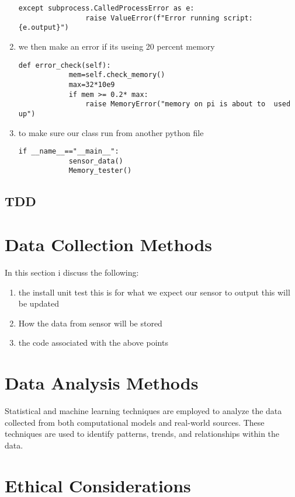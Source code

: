 \begin{enumerate}
\begin{lstlisting}[style=mystyle]
            except subprocess.CalledProcessError as e:
                raise ValueError(f"Error running script:{e.output}")
    \end{lstlisting}
    \item  we then  make an error if its useing  20 percent memory
    \begin{lstlisting}[style=mystyle]
        def error_check(self):
            mem=self.check_memory()
            max=32*10e9
            if mem >= 0.2* max:
                raise MemoryError("memory on pi is about to  used up")
    \end{lstlisting}
    \item to make sure  our class run from another python file 
    \begin{lstlisting}[style=mystyle]
        if __name__=="__main__":
            sensor_data()
            Memory_tester()
    \end{lstlisting}
\end{enumerate}
\newpage
\subsection{TDD}

\section{Data Collection Methods}
In this section  i discuss the  following:
\begin{enumerate}
    \item the  install  unit test this is for  what we  expect  our  sensor  to  output this  will  be  updated
    \item How  the data  from sensor will be stored 
    \item the code  associated   with the above points 
\end{enumerate}



\section{Data Analysis Methods}

Statistical and machine learning techniques are employed to analyze the data collected from both computational models and real-world sources. These techniques are used to identify patterns, trends, and relationships within the data.

\section{Ethical Considerations}

